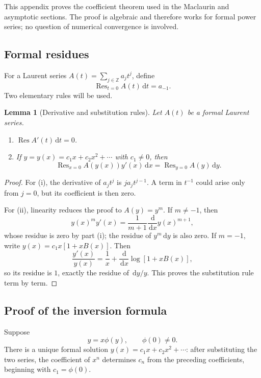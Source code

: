 \documentclass[11pt]{article}
\newtheorem{lemma}[theorem]{Lemma}
\theoremstyle{remark}
\newcommand{\Res}{\operatorname{Res}}
\newcommand{\dd}{\,\mathrm d}
\begin{document}
This appendix proves the coefficient theorem used in the Maclaurin and
asymptotic sections.  The proof is algebraic and therefore works for formal
power series; no question of numerical convergence is involved.

\subsection{Formal residues}

For a Laurent series \(A(t)=\sum_{j\in\mathbb Z}a_jt^j\), define
\[
       \Res_{t=0} A(t)\dd t=a_{-1}.
\]
Two elementary rules will be used.

\begin{lemma}[Derivative and substitution rules]\label{lem:formal-residue}
Let \(A(t)\) be a formal Laurent series.
\begin{enumerate}[label=\textup{(\roman*)}]
\item \(\Res A'(t)\dd t=0\).
\item If \(y=y(x)=c_1x+c_2x^2+\cdots\) with \(c_1\neq0\), then
\begin{equation}\label{eq:formal-change}
       \Res_{x=0}A(y(x))y'(x)\dd x
       =\Res_{y=0}A(y)\dd y.
\end{equation}
\end{enumerate}
\end{lemma}

\begin{proof}
For (i), the derivative of \(a_jt^j\) is \(ja_jt^{j-1}\).  A term in
\(t^{-1}\) could arise only from \(j=0\), but its coefficient is then zero.

For (ii), linearity reduces the proof to \(A(y)=y^m\).  If \(m\neq-1\),
then
\[
       y(x)^m y'(x)
       =\frac1{m+1}\frac{\dd}{\dd x}y(x)^{m+1},
\]
whose residue is zero by part (i); the residue of \(y^m\dd y\) is also zero.
If \(m=-1\), write \(y(x)=c_1x[1+xB(x)]\).  Then
\[
       \frac{y'(x)}{y(x)}
       =\frac1x+\frac{\dd}{\dd x}\log[1+xB(x)],
\]
so its residue is \(1\), exactly the residue of \(\dd y/y\).  This proves
the substitution rule term by term.
\end{proof}

\subsection{Proof of the inversion formula}

Suppose
\begin{equation}\label{eq:appendix-implicit}
       y=x\phi(y),\qquad \phi(0)\neq0.
\end{equation}
There is a unique formal solution \(y(x)=c_1x+c_2x^2+\cdots\): after
substituting the two series, the coefficient of \(x^n\) determines \(c_n\)
from the preceding coefficients, beginning with \(c_1=\phi(0)\).
\end{document}

